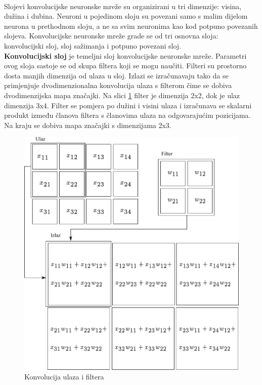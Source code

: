 \documentclass[times, utf8, zavrsni, numeric]{fer}
\begin{document}
\\\indent Slojevi konvolucijske neuronske mreže su organizirani u tri 
dimenzije: visina, dužina i dubina. Neuroni u pojedinom sloju su povezani
samo s malim dijelom neurona u prethodnom sloju, a ne sa svim neuronima kao
kod potpuno povezanih slojeva. Konvolucijske neuronske mreže grade se od
tri osnovna sloja: konvolucijski sloj, sloj sažimanja i potpuno povezani sloj.
\\\indent \textbf{Konvolucijski sloj} je temeljni sloj konvolucijske 
neuronske mreže. Parametri ovog sloja sastoje se od skupa filtera koji
se mogu naučiti. Filteri su prostorno dosta manjih dimenzija od ulaza u 
sloj. Izlazi se izračunavaju tako da se primjenjuje dvodimenzionalna
konvolucija ulaza s filterom čime se dobiva dvodimenzijska mapa
značajki. Na slici \ref{fig:conv} filter je dimenzija 2x2, dok je ulaz
dimenzija 3x4. Filter se pomjera po dužini i visini ulaza i izračunava se
skalarni produkt između članova filtera s članovima ulaza na odgovarajućim
pozicijama. Na kraju se dobiva mapa značajki s dimenzijama 2x3.
\begin{figure}[htb]
	\centering
	\includegraphics[scale=0.40]{conv.pdf}
	\caption{Konvolucija ulaza i filtera}
	\label{fig:conv}
\end{figure}
\end{document}
